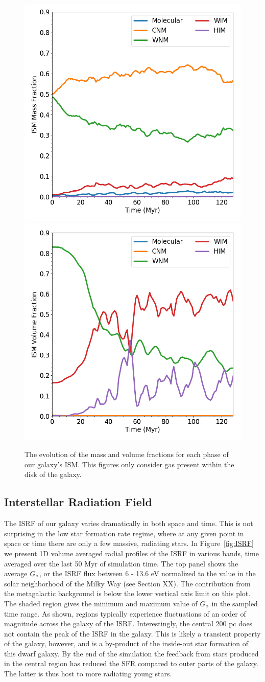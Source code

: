 \documentclass[twocolumn]{aastex61}
\begin{document}
\begin{figure}
\centering
\includegraphics[width=0.45\linewidth]{mass_fraction_evolution.png}
\includegraphics[width=0.45\linewidth]{volume_fraction_evolution.png}
\caption{The evolution of the mass and volume fractions for each phase of our galaxy's ISM. This figures only consider gas present within the disk of the galaxy.}
\label{fig:ISM_evolution}
\end{figure}

\subsection{Interstellar Radiation Field}
\label{sec:ISRF}

The ISRF of our galaxy varies dramatically in both space and time. This is not surprising in the low star formation rate regime, where at any given point in space or time there are only a few massive, radiating stars. In Figure~\ref{fig:ISRF} we present 1D volume averaged radial profiles of the ISRF in various bands, time averaged over the last 50 Myr of simulation time. The top panel shows the average $G_{\rm o}$, or the ISRF flux between 6 - 13.6 eV normalized to the value in the solar neighborhood of the Milky Way (see Section XX). The contribution from the metagalactic background is below the lower vertical axis limit on this plot. The shaded region gives the minimum and maximum value of $G_{\rm o}$ in the sampled time range. As shown, regions typically experience fluctuations of an order of magnitude across the galaxy of the ISRF. Interestingly, the central 200 pc does not contain the peak of the ISRF in the galaxy. This is likely a transient property of the galaxy, however, and is a by-product of the inside-out star formation of this dwarf galaxy. By the end of the simulation the feedback from stars produced in the central region has reduced the SFR compared to outer parts of the galaxy. The latter is thus host to more radiating young stars.
\end{document}
